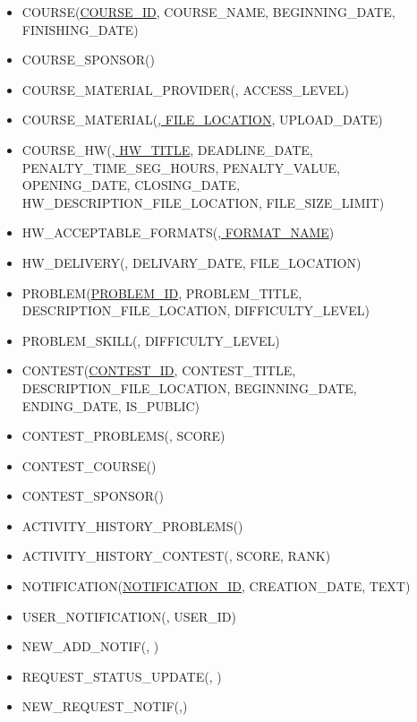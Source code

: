 \documentclass{article}
\begin{document}
\begin{flushleft}
\begin{latin}
\begin{itemize}
            \item COURSE(\underline{COURSE\_ID}, COURSE\_NAME, BEGINNING\_DATE, FINISHING\_DATE)
            \item COURSE\_SPONSOR(\underline{})
            \item COURSE\_MATERIAL\_PROVIDER(\underline{}, ACCESS\_LEVEL)
            \item COURSE\_MATERIAL(\underline{, FILE\_LOCATION}, UPLOAD\_DATE)
            \item COURSE\_HW(\underline{, HW\_TITLE}, DEADLINE\_DATE, PENALTY\_TIME\_SEG\_HOURS, PENALTY\_VALUE, OPENING\_DATE, CLOSING\_DATE, HW\_DESCRIPTION\_FILE\_LOCATION, FILE\_SIZE\_LIMIT)
            \item HW\_ACCEPTABLE\_FORMATS(\underline{, FORMAT\_NAME})
            \item HW\_DELIVERY(\underline{}, DELIVARY\_DATE, FILE\_LOCATION)
            \item PROBLEM(\underline{PROBLEM\_ID}, PROBLEM\_TITLE, DESCRIPTION\_FILE\_LOCATION, DIFFICULTY\_LEVEL)
            \item PROBLEM\_SKILL(\underline{}, DIFFICULTY\_LEVEL)
            \item CONTEST(\underline{CONTEST\_ID}, CONTEST\_TITLE, DESCRIPTION\_FILE\_LOCATION, BEGINNING\_DATE, ENDING\_DATE, IS\_PUBLIC)
            \item CONTEST\_PROBLEMS(\underline{}, SCORE)
            \item CONTEST\_COURSE(\underline{})
            \item CONTEST\_SPONSOR(\underline{})
            \item ACTIVITY\_HISTORY\_PROBLEMS(\underline{})
            \item ACTIVITY\_HISTORY\_CONTEST(\underline{}, SCORE, RANK)
            \item NOTIFICATION(\underline{NOTIFICATION\_ID}, CREATION\_DATE, TEXT)
            \item USER\_NOTIFICATION(\underline{}, USER\_ID)
            \item NEW\_ADD\_NOTIF(\underline{}, )
            \item REQUEST\_STATUS\_UPDATE(\underline{}, )
            \item NEW\_REQUEST\_NOTIF(\underline{},)
        \end{itemize}
    \end{latin}
\end{flushleft}
\end{document}
